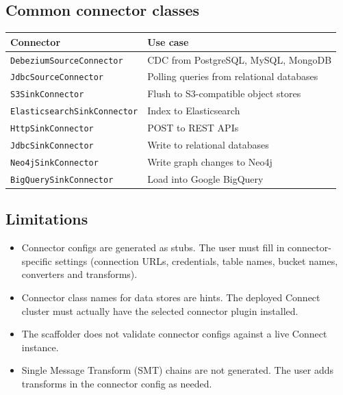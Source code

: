 \subsection{Common connector classes}

\begin{longtable}{|>{\raggedright\arraybackslash}p{}|>{\raggedright\arraybackslash}p{}|}
\hline
\rowcolor[gray]{0.9}\textbf{Connector} & \textbf{Use case} \\
\hline
\texttt{DebeziumSourceConnector} & CDC from PostgreSQL, MySQL, MongoDB \\
\texttt{JdbcSourceConnector} & Polling queries from relational databases \\
\texttt{S3SinkConnector} & Flush to S3-compatible object stores \\
\texttt{ElasticsearchSinkConnector} & Index to Elasticsearch \\
\texttt{HttpSinkConnector} & POST to REST APIs \\
\texttt{JdbcSinkConnector} & Write to relational databases \\
\texttt{Neo4jSinkConnector} & Write graph changes to Neo4j \\
\texttt{BigQuerySinkConnector} & Load into Google BigQuery \\
\hline
\end{longtable}

\subsection{Limitations}

\begin{itemize}
\item Connector configs are generated as stubs. The user must fill in
      connector-specific settings (connection URLs, credentials, table names,
      bucket names, converters and transforms).
\item Connector class names for data stores are hints. The deployed Connect
      cluster must actually have the selected connector plugin installed.
\item The scaffolder does not validate connector configs against a live
      Connect instance.
\item Single Message Transform (SMT) chains are not generated. The user
      adds transforms in the connector config as needed.
\end{itemize}
